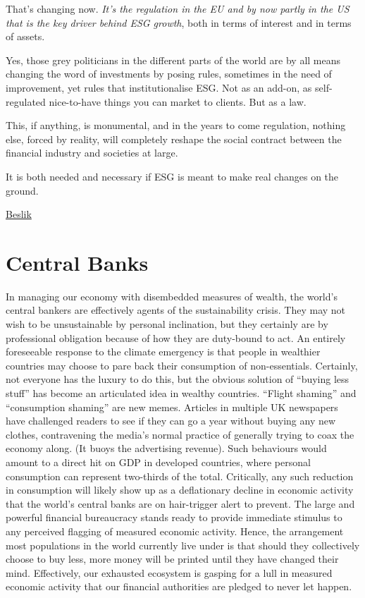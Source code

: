 \documentclass[
]{book}
\begin{document}
That's changing now. \emph{It's the regulation in the EU and by now partly in the US that is the key driver behind ESG growth}, both in terms of interest and in terms of assets.

Yes, those grey politicians in the different parts of the world are by all means changing the word of investments by posing rules, sometimes in the need of improvement, yet rules that institutionalise ESG. Not as an add-on, as self-regulated nice-to-have things you can market to clients. But as a law.

This, if anything, is monumental, and in the years to come regulation, nothing else, forced by reality, will completely reshape the social contract between the financial industry and societies at large.

It is both needed and necessary if ESG is meant to make real changes on the ground.

\href{https://esgonasunday.substack.com/p/week-19-esg-on-a-sunday-turns-1-}{Beslik}

\hypertarget{central-banks-1}{%
\chapter{Central Banks}\label{central-banks-1}}

In managing our economy with disembedded measures of wealth,
the world's central bankers are effectively agents of the sustainability crisis. They may not
wish to be unsustainable by personal inclination, but they certainly are by professional
obligation because of how they are duty-bound to act.
An entirely foreseeable response to the climate emergency is that people in wealthier
countries may choose to pare back their consumption of non-essentials. Certainly, not
everyone has the luxury to do this, but the obvious solution of ``buying less stuff'' has become
an articulated idea in wealthy countries. ``Flight shaming'' and ``consumption shaming'' are new
memes. Articles in multiple UK newspapers have challenged readers to see if they can go a
year without buying any new clothes, contravening the media's normal practice of generally
trying to coax the economy along. (It buoys the advertising revenue).
Such behaviours would amount to a direct hit on GDP in developed countries, where personal
consumption can represent two-thirds of the total. Critically, any such reduction in
consumption will likely show up as a deflationary decline in economic activity that the world's
central banks are on hair-trigger alert to prevent. The large and powerful financial
bureaucracy stands ready to provide immediate stimulus to any perceived flagging of
measured economic activity.
Hence, the arrangement most populations in the world currently live under is that should they
collectively choose to buy less, more money will be printed until they have changed their
mind. Effectively, our exhausted ecosystem is gasping for a lull in measured economic activity
that our financial authorities are pledged to never let happen.
\end{document}
